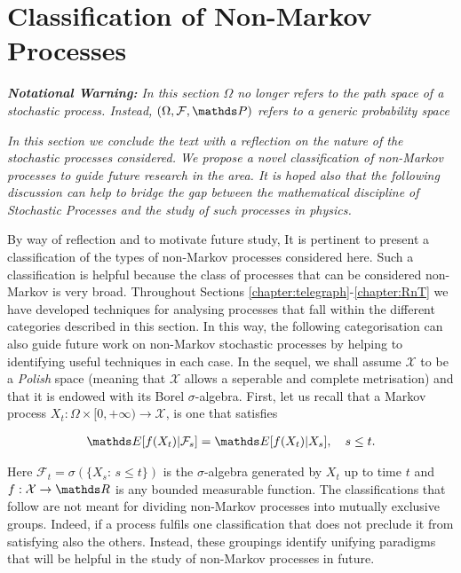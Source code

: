 \section{Classification of Non-Markov Processes}\label{chapter:classification}
\textit{\textbf{Notational Warning:} In this section $\Omega$ no longer refers to the path space of a stochastic process. Instead, $(\Omega, \mathcal{F}, \bP)$ refers to a generic probability space}

\textit{In this section we conclude the text with a reflection on the nature of the stochastic processes considered. We propose a novel classification of non-Markov processes to guide future research in the area. It is hoped also that the following discussion can help to bridge the gap between the mathematical discipline of Stochastic Processes and the study of such processes in physics.}

By way of reflection and to motivate future study, It is pertinent to present a classification of the types of non-Markov processes considered here. Such a classification is helpful because the class of processes that can be considered non-Markov is very broad. Throughout Sections \ref{chapter:telegraph}-\ref{chapter:RnT} we have developed techniques for analysing processes that fall within the different categories described in this section. In this way, the following categorisation can also guide future work on non-Markov stochastic processes by helping to identifying useful techniques in each case. In the sequel, we shall assume $\mathcal{X}$ to be a \emph{Polish} space (meaning that $\mathcal{X}$ allows a seperable and complete metrisation) and that it is endowed with its Borel $\sigma$-algebra. First, let us recall that a Markov process $X_t: \Omega \times [0,+\infty) \rightarrow \mathcal{X}$, is one that satisfies 

\begin{align}\label{Markov-property}
\bE[f(X_t) \lvert \mathcal{F}_s] = \bE[f(X_t) \lvert X_s], \quad s \leq t.
\end{align}

Here $\mathcal{F}_t = \sigma \left(\{X_s: \, s \leq t \}\right)$ is the $\sigma$-algebra generated by $X_t$ up to time $t$ and $f: \mathcal{X} \rightarrow \bR$ is any bounded measurable function. The classifications that follow are not meant for dividing non-Markov processes into mutually exclusive groups. Indeed, if a process fulfils one classification that does not preclude it from satisfying also the others. Instead, these groupings identify unifying paradigms that will be helpful in the study of non-Markov processes in future.

